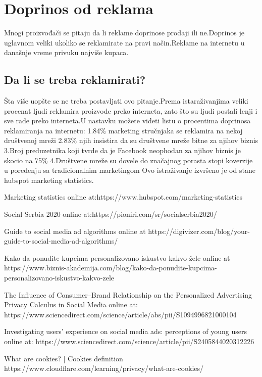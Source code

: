 \documentclass[a4paper]{article}
\begin{document}
	\section{Doprinos od reklama}
	\label{sec:doprinos}
	Mnogi proizvođači se pitaju da li reklame doprinose prodaji ili ne.Doprinos je uglavnom veliki ukoliko se reklamirate na pravi način.Reklame na internetu u današnje vreme privuku najviše kupaca.
	\subsection{Da li se treba reklamirati?}
	\label{subsec:potrebna_reklama}
	Šta više uopšte se ne treba postavljati ovo pitanje.Prema istaraživanjima veliki procenat ljudi reklamira proizvode preko interneta, zato što su ljudi postali lenji i sve rade preko interneta.U nastavku možete videti listu o procentima doprinosa reklamiranja na internetu:
	1.84\% marketing stručnjaka se reklamira na nekoj društvenoj mreži
	2.83\% njih insistira da su društvene mreže bitne za njihov biznis
	3.Broj preduzetnika koji tvrde da je Facebook neophodan za njihov biznis je skocio na 75\%
	4.Društvene mreže su dovele do značajnog porasta stopi koverzije u poređenju sa tradicionalnim marketingom 
	Ovo istraživanje izvršeno je od stane hubspot marketing statistics.
	
	\newpage
	\appendix
	

	
	\begin{thebibliography}{9}
		
		 Marketing statistics online at:https://www.hubspot.com/marketing-statistics
		
		 Social Serbia 2020 online at:https://pioniri.com/sr/socialserbia2020/
		
			Guide to social media ad algorithms online at https://digivizer.com/blog/your-guide-to-social-media-ad-algorithms/ 
		
		 Kako da ponudite kupcima personalizovano iskustvo kakvo žele online at https://www.biznis-akademija.com/blog/kako-da-ponudite-kupcima-personalizovano-iskustvo-kakvo-zele
		
		 The Influence of Consumer–Brand Relationship on the Personalized Advertising Privacy Calculus in Social Media online at: https://www.sciencedirect.com/science/article/abs/pii/S1094996821000104        
		
		 Investigating users’ experience on social media ads: perceptions of young users online at: https://www.sciencedirect.com/science/article/pii/S2405844020312226
		
		 What are cookies? | Cookies definition https://www.cloudflare.com/learning/privacy/what-are-cookies/
		
		
	\end{thebibliography}
	
	
	\appendix
\end{document}
